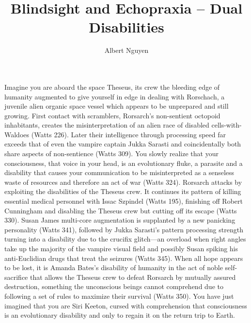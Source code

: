 \documentclass[12pt]{article}
\title{Blindsight and Echopraxia -- Dual Disabilities}
\author{Albert Nguyen}
\date{}
\begin{document}
\maketitle

Imagine you are aboard the space Theseus, its crew the bleeding edge of humanity augmented to give yourself in edge in dealing with Rorschach, a juvenile alien organic space vessel which appears to be unprepared and still growing. First contact with scramblers, Rorsarch's non-sentient octopoid inhabitants, creates the misinterpretation of an alien race of disabled cells-with-Waldoes \cite{blindsight} (Watts 226). Later their intelligence through processing speed far exceeds that of even the vampire captain Jukka Sarasti and coincidentally both share aspects of non-sentience \cite{blindsight} (Watts 309). You slowly realize that your consciousness, that voice in your head, is an evolutionary fluke, a parasite and a disability that causes your communication to be misinterpreted as a senseless waste of resources and therefore an act of war \cite{blindsight} (Watts 324). Rorsarch attacks by exploiting the disabilities of the Theseus crew. It continues its pattern of killing essential medical personnel with Issac Szpindel \cite{blindsight} (Watts 195), finishing off Robert Cunningham and disabling the Theseus crew but cutting off its escape \cite{blindsight} (Watts 330). Susan James multi-core augmentation is supplanted by a new panicking personality \cite{blindsight} (Watts 341), followed by Jukka Sarasti's pattern processing strength turning into a disability due to the crucifix glitch—an overload when right angles take up the majority of the vampire visual field and possibly Susan spiking his anti-Euclidian drugs that treat the seizures \cite{blindsight} (Watts 345). When all hope appears to be lost, it is Amanda Bates's disability of humanity in the act of noble self-sacrifice that allows the Theseus crew to defeat Rorsarch by mutually assured destruction, something the unconscious beings cannot comprehend due to following a set of rules to maximize their survival \cite{blindsight} (Watts 350). You have just imagined that you are Siri Keeton, cursed with comprehension that consciousness is an evolutionary disability and only to regain it on the return trip to Earth.
\end{document}
